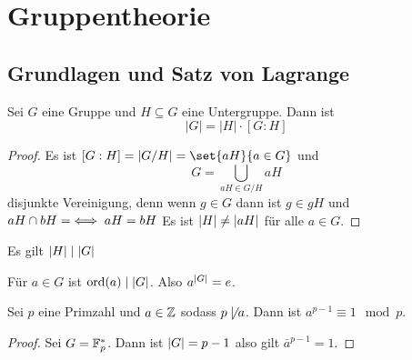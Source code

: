 \chapter{Gruppentheorie}
\section{Grundlagen und Satz von Lagrange}
\begin{Satz}[Gruppenordnung]
    Sei \(G\) eine Gruppe und \(H\subseteq G\) eine Untergruppe. Dann ist \[|G|=|H|\cdot [G:H]\]
\end{Satz}
\begin{proof}
    Es ist \([G:H]=\abs{G/H}=\set{aH}{a\in G}\) und \[G=\bigcup_{aH\in G/H}aH\] disjunkte Vereinigung, denn wenn \(g\in G\) dann ist \(g\in gH\) und \(aH\cap bH=\empty \iff aH=bH\) Es ist \(\lvert H\rvert\not=\lvert aH\rvert\) für alle \(a\in G\).
\end{proof}
\begin{Kor}\label{Kor:Lagrange}
    Es gilt \(\lvert H\rvert\mid\lvert G\rvert\)
\end{Kor}
\begin{Kor}\label{Kor:Lagrange2}
Für \(a\in G\) ist \(\operatorname{ord}(a)\mid \lvert G\rvert\). Also \(a^{\lvert G\rvert}=e\).
\end{Kor}
\begin{Kor}\label{Kleiner Satz von Fermat}
    Sei \(p\) eine Primzahl und \(a\in\mathbb{Z}\) sodass \(p\not\mid a\). Dann ist \(a^{p-1}\equiv 1\mod p\).
\end{Kor}
\begin{proof}
    Sei \(G=\mathbb{F}_p^*\). Dann ist \(\lvert G\rvert=p-1\) also gilt \(\bar a^{p-1}=1\).
\end{proof}

